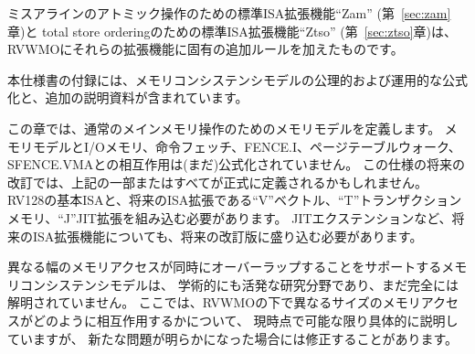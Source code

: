 \begin{comment}
The standard ISA extension for misaligned atomics ``Zam'' (Chapter~\ref{sec:zam}) and the standard ISA extension for total store ordering ``Ztso'' (Chapter~\ref{sec:ztso}) augment RVWMO with additional rules specific to those extensions.
\end{comment}

ミスアラインのアトミック操作のための標準ISA拡張機能``Zam'' (第~\ref{sec:zam}章)と
total store orderingのための標準ISA拡張機能``Ztso'' (第~\ref{sec:ztso}章)は、
RVWMOにそれらの拡張機能に固有の追加ルールを加えたものです。

\begin{comment}
The appendices to this specification provide both axiomatic and operational formalizations of the memory consistency model as well as additional explanatory material.
\end{comment}

本仕様書の付録には、メモリコンシステンシモデルの公理的および運用的な公式化と、追加の説明資料が含まれています。

\begin{commentary}
\begin{comment}
  This chapter defines the memory model for regular main memory operations.  The interaction of the memory model with I/O memory, instruction fetches, FENCE.I, page table walks, and SFENCE.VMA is not (yet) formalized.  Some or all of the above may be formalized in a future revision of this specification.  The RV128 base ISA and future ISA extensions such as the ``V'' vector, ``T'' transactional memory, and ``J'' JIT extensions will need to be incorporated into a future revision as well.
\end{comment}
  この章では、通常のメインメモリ操作のためのメモリモデルを定義します。 
メモリモデルとI/Oメモリ、命令フェッチ、FENCE.I、ページテーブルウォーク、SFENCE.VMAとの相互作用は(まだ)公式化されていません。 
この仕様の将来の改訂では、上記の一部またはすべてが正式に定義されるかもしれません。 
RV128の基本ISAと、将来のISA拡張である``V''ベクトル、``T''トランザクションメモリ、``J''JIT拡張を組み込む必要があります。
JITエクステンションなど、将来のISA拡張機能についても、将来の改訂版に盛り込む必要があります。

\begin{comment}
  Memory consistency models supporting overlapping memory accesses of different widths simultaneously remain an active area of academic research and are not yet fully understood.  The specifics of how memory accesses of different sizes interact under RVWMO are specified to the best of our current abilities, but they are subject to revision should new issues be uncovered.
\end{comment}
  異なる幅のメモリアクセスが同時にオーバーラップすることをサポートするメモリコンシステンシモデルは、
学術的にも活発な研究分野であり、まだ完全には解明されていません。 
ここでは、RVWMOの下で異なるサイズのメモリアクセスがどのように相互作用するかについて、
現時点で可能な限り具体的に説明していますが、
新たな問題が明らかになった場合には修正することがあります。
\end{commentary}

